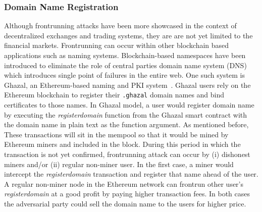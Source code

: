 \subsubsection{Domain Name Registration} 



%
Although frontrunning attacks have been more showcased in the context of decentralized exchanges and trading systems, they are are not yet limited to the financial markets. Frontrunning can occur within other blockchain based applications such as naming systems. Blockchain-based namespaces have been introduced to eliminate the role of central parties \ie domain name system (DNS) which introduces single point of failures in the entire web. One such system is Ghazal, an Ethereum-based naming and PKI system~\cite{moosavighazal}. Ghazal users rely on the Ethereum blockchain to register their \texttt{.ghazal} domain names and bind certificates to those names. In Ghazal model, a user would register domain name by executing the \textit{registerdomain} function from the Ghazal smart contract with the domain name in plain text as the function argument. As mentioned before, These transactions will sit in the mempool so that it would be mined by Ethereum miners and included in the block. During this period in which the transaction is not yet confirmed, frontrunning attack can occur by (i) dishonest miners and/or (ii) regular non-miner user. In the first case, a miner would intercept the \textit{registerdomain} transaction and register that name ahead of the user. A regular non-miner node in the Ethereum network can frontrun other user's \textit{registerdomain} at a good profit by paying higher transaction fees. In both cases the adversarial party could sell the domain name to the users for higher price.








